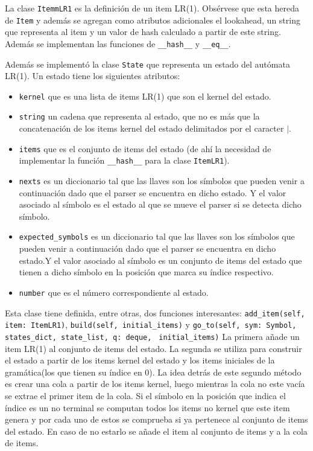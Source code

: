 La clase \verb|ItemmLR1| es la definici\'on de un item LR(1). Obs\'ervese que esta hereda de \verb|Item| y adem\'as se agregan como atributos adicionales el lookahead, un string que representa al item y un valor de hash calculado a partir de este string. Adem\'as se implementan las funciones de \verb|__hash__| y \verb|__eq__|. 

Adem\'as se implement\'o la clase \verb|State| que representa un estado del aut\'omata LR(1). Un estado tiene los siguientes atributos:

\begin{itemize}
	\item \verb|kernel| que es una lista de items LR(1) que son el kernel del estado.
	\item \verb|string| un cadena que representa al estado, que no es m\'as que la concatenaci\'on de los items kernel del estado delimitados por el caracter $|$.
	\item \verb|items| que es el conjunto de items del estado (de ah\'i la necesidad de implementar la funci\'on \verb|__hash__| para la clase \verb|ItemLR1|).
	\item \verb|nexts| es un diccionario tal que las llaves son los s\'imbolos que pueden venir a continuaci\'on dado que el parser se encuentra en dicho estado. Y el valor asociado al s\'imbolo es el estado al que se mueve el parser si se detecta dicho s\'imbolo.
	\item \verb|expected_symbols| es un diccionario tal que las llaves son los s\'imbolos que pueden venir a continuaci\'on dado que el parser se encuentra en dicho estado.Y el valor asociado al s\'imbolo es un conjunto de items del estado que tienen a dicho s\'imbolo en la posici\'on que marca su \'indice respectivo.
	\item \verb|number| que es el n\'umero correspondiente al estado.
\end{itemize} 

Esta clase tiene definida, entre otras, dos funciones interesantes: \verb|add_item(self, item: ItemLR1)|, \verb|build(self, initial_items)| y \verb|go_to(self, sym: Symbol, states_dict, state_list, q: deque,| \verb| initial_items)| La primera a\~{n}ade un item LR(1) al conjunto de items del estado. La segunda se utiliza para construir el estado a partir de los items kernel del estado y los items iniciales de la gram\'atica(los que tienen su \'indice en 0). La idea detr\'as de este segundo m\'etodo es crear una cola a partir de los items kernel, luego mientras la cola no este vac\'ia se extrae el primer item de la cola. Si el s\'imbolo en la posici\'on que indica el \'indice es un no terminal se computan todos los items no kernel que este item genera y por cada uno de estos se comprueba si ya pertenece al conjunto de items del estado. En caso de no estarlo se a\~{n}ade el item al conjunto de items y a la cola de items. 

